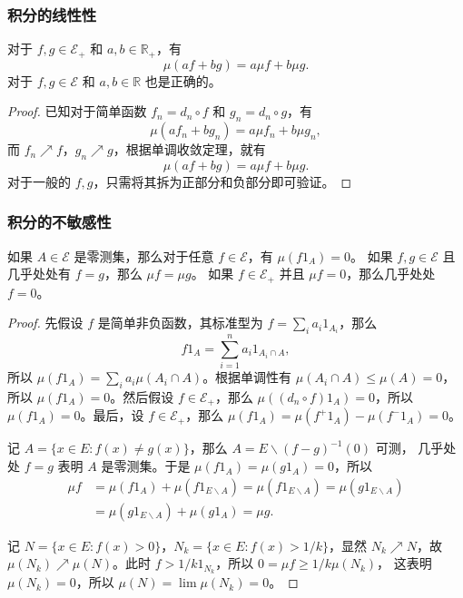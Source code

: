 \documentclass[fontset=none]{Notes}
\begin{document}
\subsubsection{积分的线性性}

\begin{proposition}
  对于 $f,g\in \mathcal{E}_+$ 和 $a,b\in \mathbb{R}_+$，有
  \[
    \mu(af+bg)=a\mu f+b\mu g.  
  \]
  对于 $f,g\in \mathcal{E}$ 和 $a,b\in \mathbb{R}$ 也是正确的。
\end{proposition}
\begin{proof}
  已知对于简单函数 $f_n=d_n\circ f$ 和 $g_n=d_n\circ g$，有
  \[
    \mu(af_n+bg_n)=a\mu f_n+b\mu g_n,  
  \]
  而 $f_n\nearrow f$，$g_n\nearrow g$，根据单调收敛定理，就有
  \[
    \mu(af+bg)=a\mu f+b\mu g.  
  \]
  对于一般的 $f,g$，只需将其拆为正部分和负部分即可验证。
\end{proof}

\subsubsection{积分的不敏感性}

\begin{proposition}
  如果 $A\in \mathcal{E}$ 是零测集，那么对于任意 $f\in \mathcal{E}$，有 $\mu(f1_A)=0$。
  如果 $f,g\in \mathcal{E}$ 且几乎处处有 $f=g$，那么 $\mu f=\mu g$。
  如果 $f\in \mathcal{E}_+$ 并且 $\mu f=0$，那么几乎处处 $f=0$。
\end{proposition}
\begin{proof}
  先假设 $f$ 是简单非负函数，其标准型为 $f=\sum_i a_i 1_{A_i}$，那么
  \[
    f1_A=\sum_{i=1}^n a_i 1_{A_i\cap A},
  \]
  所以 $\mu(f1_A)=\sum_i a_i\mu(A_i\cap A)$。根据单调性有 $\mu(A_i\cap A)\leq \mu(A)=0$，
  所以 $\mu(f1_A)=0$。然后假设 $f\in \mathcal{E}_+$，那么 $\mu((d_n\circ f)1_A)=0$，所以
  $\mu(f1_A)=0$。最后，设 $f\in \mathcal{E}_+$，那么 $\mu(f1_A)=\mu(f^+1_A)-\mu (f^-1_A)=0$。

  记 $A=\{x\in E:f(x)\neq g(x)\}$，那么 $A=E \smallsetminus(f-g)^{-1}(0)$ 可测，
  几乎处处 $f=g$ 表明 $A$ 是零测集。于是 $\mu(f1_A)=\mu(g1_A)=0$，所以
  \begin{align*}
    \mu f&=\mu(f1_A)+\mu(f1_{E \smallsetminus A})=\mu(f1_{E \smallsetminus A})
    =
    \mu(g1_{E \smallsetminus A})\\&=\mu(g1_{E \smallsetminus A})+\mu(g1_A)=\mu g.
  \end{align*}

  记 $N=\{x\in E: f(x)>0\}$，$N_k=\{x\in E:f(x)>1/k\}$，显然 $N_k\nearrow N$，故
  $\mu(N_k)\nearrow \mu(N)$。此时 $f> 1/k1_{N_k}$，所以 $0=\mu f\geq 1/k\mu(N_k)$，
  这表明 $\mu(N_k)=0$，所以 $\mu(N)=\lim\mu(N_k)=0$。
\end{proof}
\end{document}
